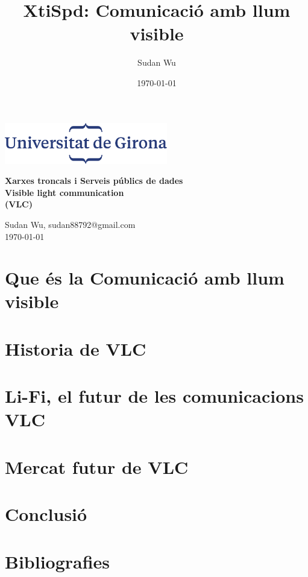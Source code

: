 \documentclass[10pt,a4paper]{article}
\title{XtiSpd: Comunicació amb llum visible}
\author{Sudan Wu}
\date{\today}
\begin{document}
\begin{titlepage}
    \begin{center}
        \includegraphics[height=1.8cm]{logoUdG}\\\vfill
    \end{center}
    \center
    {\huge \bfseries Xarxes troncals i Serveis públics de dades}\\[0.5cm]
    {\Huge \bfseries Visible light communication} \\[0.5cm]
    {\Huge \bfseries (VLC)} \\[0.5cm]

    \vfill
    \begin{center} \large
        {Sudan Wu, sudan88792@gmail.com} \\[0.25cm]
        {\today}\\ [1cm]
    \end{center}

\end{titlepage}

\tableofcontents

\clearpage

\section{Que és la Comunicació amb llum visible}


\section{Historia de VLC}

\clearpage
\section{Li-Fi, el futur de les comunicacions VLC}


\section{Mercat futur de VLC}


\clearpage
\section{Conclusió}

\clearpage

\section{Bibliografies}

\clearpage
\end{document}
